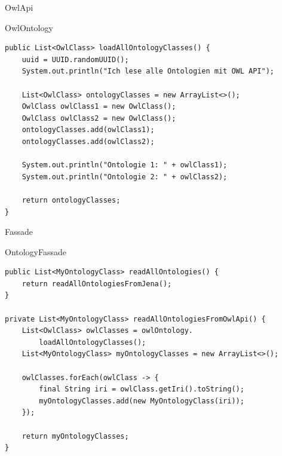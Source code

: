 \begin{frame}[fragile]{OwlApi}
	\begin{exampleblock}{OwlOntology}
 		\begin{lstlisting}
public List<OwlClass> loadAllOntologyClasses() {
    uuid = UUID.randomUUID();
    System.out.println("Ich lese alle Ontologien mit OWL API");
    
    List<OwlClass> ontologyClasses = new ArrayList<>();
    OwlClass owlClass1 = new OwlClass();
    OwlClass owlClass2 = new OwlClass();
    ontologyClasses.add(owlClass1);
    ontologyClasses.add(owlClass2);

    System.out.println("Ontologie 1: " + owlClass1);
    System.out.println("Ontologie 2: " + owlClass2);
    
    return ontologyClasses;
} 		    
 		\end{lstlisting}
 	\end{exampleblock}
\end{frame}

\begin{frame}[fragile]{Fassade}
	\begin{exampleblock}{OntologyFassade}
 		\begin{lstlisting}
public List<MyOntologyClass> readAllOntologies() {
    return readAllOntologiesFromJena();
}

private List<MyOntologyClass> readAllOntologiesFromOwlApi() {
    List<OwlClass> owlClasses = owlOntology.
        loadAllOntologyClasses();
    List<MyOntologyClass> myOntologyClasses = new ArrayList<>();
    
    owlClasses.forEach(owlClass -> { 
        final String iri = owlClass.getIri().toString();
        myOntologyClasses.add(new MyOntologyClass(iri));
    });
    
    return myOntologyClasses;
} 		    
 		\end{lstlisting}
 	\end{exampleblock}
\end{frame}

